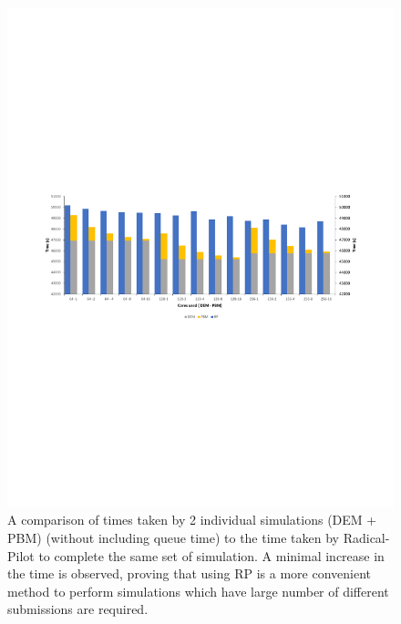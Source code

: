 \documentclass[preprint,11pt,authoryear]{elsarticle}
\begin{document}
\begin{figure}
\centering
\includegraphics[scale=1]{final_RP_plot.pdf}
\caption{A comparison of times taken by 2 individual simulations (DEM + PBM) (without 
including queue time) to the  time taken by 
Radical-Pilot to complete the same set of simulation. A minimal increase in the time is observed, proving that using RP is 
a more convenient method to perform simulations which have large number of different submissions are required.}
\label{fig:rslts_RP_time_plot}
\end{figure}
	    
\end{document}
